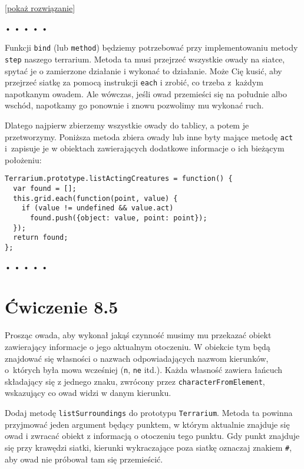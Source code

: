   
[\hyperref[sol:8.4]{pokaż rozwiązanie}]
  


\begin{center}
• • • • •
\end{center}

  
Funkcji \texttt{bind} (lub \texttt{method}) będziemy potrzebować przy implementowaniu metody \texttt{step} naszego terrarium. Metoda ta musi przejrzeć wszystkie owady na siatce, spytać je o zamierzone działanie i wykonać to działanie. Może Cię kusić, aby przejrzeć siatkę za pomocą instrukcji \texttt{each} i zrobić, co trzeba z~każdym napotkanym owadem. Ale wówczas, jeśli owad przemieści się na południe albo wschód, napotkamy go ponownie i znowu pozwolimy mu wykonać ruch.

  
Dlatego najpierw zbierzemy wszystkie owady do tablicy, a potem je przetworzymy. Poniższa metoda zbiera owady lub inne byty mające metodę \texttt{act} i~zapisuje je w obiektach zawierających dodatkowe informacje o ich bieżącym położeniu:

  
\begin{verbatim} 
Terrarium.prototype.listActingCreatures = function() {
  var found = [];
  this.grid.each(function(point, value) {
    if (value != undefined && value.act)
      found.push({object: value, point: point});
  });
  return found;
};
 \end{verbatim}


\begin{center}
• • • • •
\end{center}

  
\section*{Ćwiczenie 8.5}
\label{sec:8.5}
  
    
Prosząc owada, aby wykonał jakąś czynność musimy mu przekazać obiekt zawierający informacje o jego aktualnym otoczeniu. W obiekcie tym będą znajdować się własności o nazwach odpowiadających nazwom kierunków, o~których była mowa wcześniej (\texttt{n}, \texttt{ne} itd.). Każda własność zawiera łańcuch składający się z jednego znaku, zwrócony przez \texttt{characterFromElement}, wskazujący co owad widzi w danym kierunku.

    
Dodaj metodę \texttt{listSurroundings} do prototypu \texttt{Terrarium}. Metoda ta powinna przyjmować jeden argument będący punktem, w którym aktualnie znajduje się owad i zwracać obiekt z informacją o otoczeniu tego punktu. Gdy punkt znajduje się przy krawędzi siatki, kierunki wykraczające poza siatkę oznaczaj znakiem \texttt{\#}, aby owad nie próbował tam się przemieścić.

